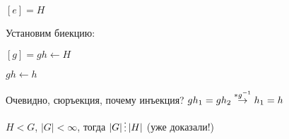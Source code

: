 \documentclass[main, 12pt, fleqn]{subfiles}
\begin{document}
\begin{utv}
    $[e]=H$
    
    Установим биекцию: 
    
    $[g]=gh \leftarrow H$
    
    $gh \leftarrow h$
    
    Очевидно, сюръекция, почему инъекция? $g h_1 = g h_2 \overset{*g^{-1}}{\rightarrow} h_1 = h$
\end{utv}

\begin{theorem}[Лагранжа]
$H < G$, $|G| < \infty$, тогда $|G| \devides |H|$ (уже доказали!)
\end{theorem}
\end{document}
